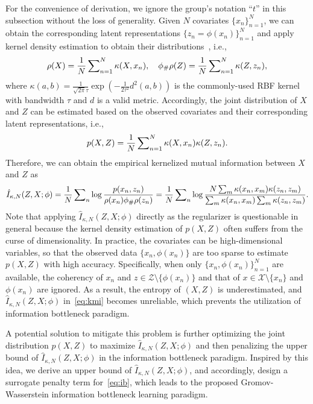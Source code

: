 \documentclass{article}
\begin{document}
For the convenience of derivation, we ignore the group's notation ``$t$'' in this subsection without the loss of generality. 
Given $N$ covariates $\{x_n\}_{n=1}^{N}$, we can obtain the corresponding latent representations $\{z_n=\phi(x_n)\}_{n=1}^{N}$ and apply kernel density estimation to obtain their distributions~\cite{chuang2023infoot}, i.e., 
\begin{eqnarray}\label{eq:marginal}
    \rho(X)=\frac{1}{N}\sideset{}{_{n=1}^{N}}\sum\kappa(X, x_{n}),\quad \phi_{\#}\rho(Z)=\frac{1}{N}\sideset{}{_{n=1}^{N}}\sum\kappa(Z, z_{n}),
\end{eqnarray}
where $\kappa(a,b)=\frac{1}{\sqrt{2\pi}\tau}\exp(-\frac{1}{2\tau^2}d^2(a,b))$ is the commonly-used RBF kernel with bandwidth $\tau$ and $d$ is a valid metric.
Accordingly, the joint distribution of $X$ and $Z$ can be estimated based on the observed covariates and their corresponding latent representations, i.e.,
\begin{eqnarray}\label{eq:joint}
    p(X, Z) = \frac{1}{N}\sideset{}{_{n=1}^{N}}\sum \kappa(X,x_{n})\kappa(Z,z_{n}).
\end{eqnarray}
Therefore, we can obtain the empirical kernelized mutual information between $X$ and $Z$ as
\begin{eqnarray}\label{eq:kmi}
    \hat{I}_{\kappa,N}(Z,X;\phi)=\frac{1}{N}\sideset{}{_{n}}\sum\log\frac{p(x_{n},z_{n})}{\rho(x_{n})\phi_{\#}\rho(z_{n})}
    =\frac{1}{N}\sideset{}{_{n}}\sum\log\frac{N \sum_{m}\kappa(x_{n},x_{m})\kappa(z_{n},z_{m})}{\sum_{m}\kappa(x_{n},x_{m})\sum_{m}\kappa(z_{n},z_{m})}.
\end{eqnarray}
Note that applying $\hat{I}_{\kappa,N}(Z,X;\phi)$ directly as the regularizer is questionable in general because the kernel density estimation of $p(X,Z)$ often suffers from the curse of dimensionality.
In practice, the covariates can be high-dimensional variables, so that the observed data $\{x_n,\phi(x_n)\}$ are too sparse to estimate $p(X,Z)$ with high accuracy. 
Specifically, when only $\{x_n,\phi(x_n)\}_{n=1}^{N}$ are available, the coherency of $x_n$ and $z\in\mathcal{Z}\setminus \{\phi({x_n})\}$ and that of $x\in\mathcal{X}\setminus\{x_n\}$ and $\phi(x_n)$ are ignored. 
As a result, the entropy of $(X,Z)$ is underestimated, and $\hat{I}_{\kappa,N}(Z,X;\phi)$ in~\eqref{eq:kmi} becomes unreliable, which prevents the utilization of information bottleneck paradigm. 


A potential solution to mitigate this problem is further optimizing the joint distribution $p(X,Z)$ to maximize $\hat{I}_{\kappa,N}(Z,X;\phi)$ and then penalizing the upper bound of $\hat{I}_{\kappa,N}(Z,X;\phi)$ in the information bottleneck paradigm.
Inspired by this idea, we derive an upper bound of $\hat{I}_{\kappa,N}(Z,X;\phi)$, and accordingly, design a surrogate penalty term for~\eqref{eq:ib}, which leads to the proposed Gromov-Wasserstein information bottleneck learning paradigm. 
\end{document}
